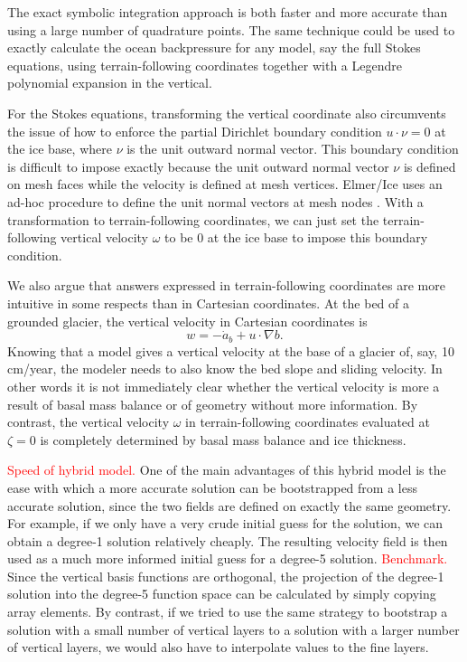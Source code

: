 \documentclass{article}
\theoremstyle{definition}
\theoremstyle{plain}
\begin{document}
The exact symbolic integration approach is both faster and more accurate than using a large number of quadrature points.
The same technique could be used to exactly calculate the ocean backpressure for any model, say the full Stokes equations, using terrain-following coordinates together with a Legendre polynomial expansion in the vertical.

For the Stokes equations, transforming the vertical coordinate also circumvents the issue of how to enforce the partial Dirichlet boundary condition $u\cdot \nu = 0$ at the ice base, where $\nu$ is the unit outward normal vector.
This boundary condition is difficult to impose exactly because the unit outward normal vector $\nu$ is defined on mesh faces while the velocity is defined at mesh vertices.
Elmer/Ice uses an ad-hoc procedure to define the unit normal vectors at mesh nodes \citep{gagliardini2013capabilities}.
With a transformation to terrain-following coordinates, we can just set the terrain-following vertical velocity $\omega$ to be 0 at the ice base to impose this boundary condition.

We also argue that answers expressed in terrain-following coordinates are more intuitive in some respects than in Cartesian coordinates.
At the bed of a grounded glacier, the vertical velocity in Cartesian coordinates is
\begin{equation}
    w = -\dot a_b + u\cdot\nabla b.
\end{equation}
Knowing that a model gives a vertical velocity at the base of a glacier of, say, 10 cm/year, the modeler needs to also know the bed slope and sliding velocity.
In other words it is not immediately clear whether the vertical velocity is more a result of basal mass balance or of geometry without more information.
By contrast, the vertical velocity $\omega$ in terrain-following coordinates evaluated at $\zeta = 0$ is completely determined by basal mass balance and ice thickness.

\textcolor{red}{Speed of hybrid model.}
One of the main advantages of this hybrid model is the ease with which a more accurate solution can be bootstrapped from a less accurate solution, since the two fields are defined on exactly the same geometry.
For example, if we only have a very crude initial guess for the solution, we can obtain a degree-1 solution relatively cheaply.
The resulting velocity field is then used as a much more informed initial guess for a degree-5 solution.
\textcolor{red}{Benchmark.}
Since the vertical basis functions are orthogonal, the projection of the degree-1 solution into the degree-5 function space can be calculated by simply copying array elements.
By contrast, if we tried to use the same strategy to bootstrap a solution with a small number of vertical layers to a solution with a larger number of vertical layers, we would also have to interpolate values to the fine layers.
\end{document}
